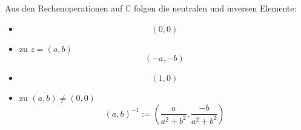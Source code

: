 Aus den Rechenoperationen auf $\mathbb{C}$ folgen die neutralen und inversen Elemente:
\begin{itemize}[label={},leftmargin=*]
    \item {}
    $$(0, 0)$$
    \item {} zu $z = (a, b)$
    $$(-a, -b)$$
    \item {}
    $$(1, 0)$$
    \item {} zu $(a, b) \neq (0, 0)$
    $$(a, b)^{-1} := \left(\frac{a}{a^2+b^2}, \frac{-b}{a^2+b^2}\right)$$
\end{itemize}